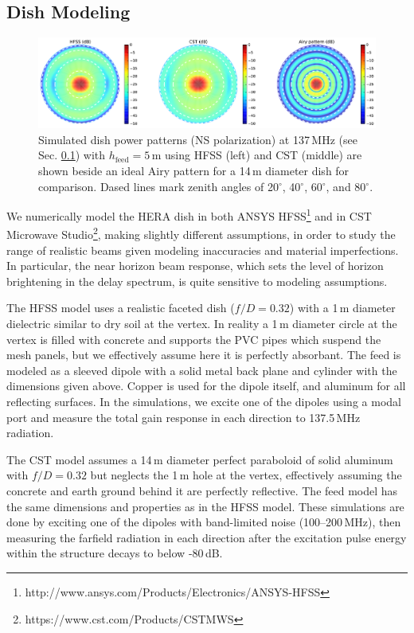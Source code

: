 \documentclass{emulateapj}
\begin{document}
\subsection{Dish Modeling}
\label{sec:dishmodels}

\begin{figure}
\centering
\includegraphics[width=7in]{dave195_rich195_airy_beams.pdf}
\caption{Simulated dish power patterns (NS polarization) at 137\,MHz (see Sec. \ref{sec:dishmodels}) with $h_\text{feed}=5$\,m using HFSS (left) and CST (middle) are shown beside an ideal Airy pattern for a 14\,m diameter dish for comparison. Dased lines mark zenith angles of 20$^\circ$, 40$^\circ$, 60$^\circ$, and 80$^\circ$.}
\label{fig:modelbeams}
\end{figure}

We numerically model the HERA dish in both ANSYS HFSS\footnote{http://www.ansys.com/Products/Electronics/ANSYS-HFSS} and in CST Microwave Studio\footnote{https://www.cst.com/Products/CSTMWS}, making slightly different assumptions, in order to study the range of realistic beams given modeling inaccuracies and material imperfections. In particular, the near horizon beam response, which sets the level of horizon brightening in the delay spectrum, is quite sensitive to modeling assumptions. 

The HFSS model uses a realistic faceted dish \citep{deboer16} ($f/D=0.32$) with a 1\,m diameter dielectric similar to dry soil at the vertex. In reality a 1\,m diameter circle at the vertex is filled with concrete and supports the PVC pipes which suspend the mesh panels, but we effectively assume here it is perfectly absorbant.  The feed is modeled as a sleeved dipole with a solid metal back plane and cylinder with the dimensions given above. Copper is used for the dipole itself, and aluminum for all reflecting surfaces. In the simulations, we excite one of the dipoles using a modal port and measure the total gain response in each direction to 137.5\,MHz radiation. 

The CST model assumes a 14\,m diameter perfect paraboloid of solid aluminum with $f/D=0.32$ but neglects the 1\,m hole at the vertex, effectively assuming the concrete and earth ground behind it are perfectly reflective. The feed model has the same dimensions and properties as in the HFSS model. These simulations are done by exciting one of the dipoles with band-limited noise (100--200\,MHz), then measuring the farfield radiation in each direction after the excitation pulse energy within the structure decays to below -80\,dB. 
\end{document}
